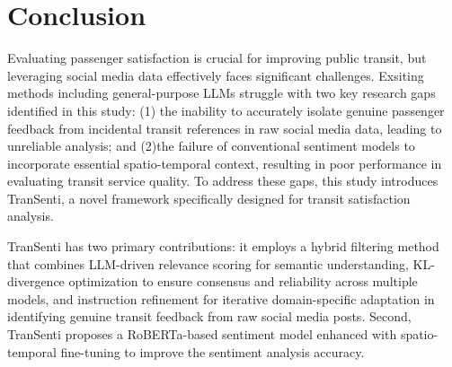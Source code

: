 \documentclass[a4paper,fleqn,12pt]{cas-sc}
\begin{document}



\section{Conclusion}\label{sec:conclusion}
Evaluating passenger satisfaction is crucial for improving public transit, but leveraging social media data effectively faces significant challenges. Exsiting methods including general-purpose LLMs struggle with two key research gaps identified in this study: (1) the inability to accurately isolate genuine passenger feedback from incidental transit references in raw social media data, leading to unreliable analysis; and (2)the failure of conventional sentiment models to incorporate essential spatio-temporal context, resulting in poor performance in evaluating transit service quality. To address these gaps, this study introduces TranSenti, a novel framework specifically designed for transit satisfaction analysis. 

TranSenti has two primary contributions: it employs a hybrid filtering method that combines LLM-driven relevance scoring for semantic understanding, KL-divergence optimization to ensure consensus and reliability across multiple models, and instruction refinement for iterative domain-specific adaptation in identifying genuine transit feedback from raw social media posts. Second, TranSenti proposes a RoBERTa-based sentiment model enhanced with spatio-temporal fine-tuning to improve the sentiment analysis accuracy. 
\end{document}
